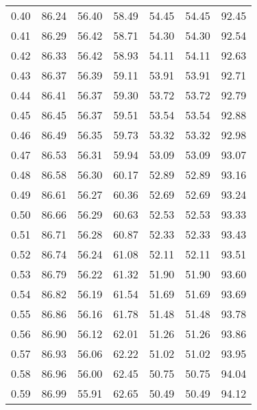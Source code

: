 \begin{tabular}{|c|c|c|c|c|c|c|}
      0.40 &     86.24 &     56.40 &      58.49 &   54.45 &      54.45 &         92.45 \\
      0.41 &     86.29 &     56.42 &      58.71 &   54.30 &      54.30 &         92.54 \\
      0.42 &     86.33 &     56.42 &      58.93 &   54.11 &      54.11 &         92.63 \\
      0.43 &     86.37 &     56.39 &      59.11 &   53.91 &      53.91 &         92.71 \\
      0.44 &     86.41 &     56.37 &      59.30 &   53.72 &      53.72 &         92.79 \\
      0.45 &     86.45 &     56.37 &      59.51 &   53.54 &      53.54 &         92.88 \\
      0.46 &     86.49 &     56.35 &      59.73 &   53.32 &      53.32 &         92.98 \\
      0.47 &     86.53 &     56.31 &      59.94 &   53.09 &      53.09 &         93.07 \\
      0.48 &     86.58 &     56.30 &      60.17 &   52.89 &      52.89 &         93.16 \\
      0.49 &     86.61 &     56.27 &      60.36 &   52.69 &      52.69 &         93.24 \\
      0.50 &     86.66 &     56.29 &      60.63 &   52.53 &      52.53 &         93.33 \\
      0.51 &     86.71 &     56.28 &      60.87 &   52.33 &      52.33 &         93.43 \\
      0.52 &     86.74 &     56.24 &      61.08 &   52.11 &      52.11 &         93.51 \\
      0.53 &     86.79 &     56.22 &      61.32 &   51.90 &      51.90 &         93.60 \\
      0.54 &     86.82 &     56.19 &      61.54 &   51.69 &      51.69 &         93.69 \\
      0.55 &     86.86 &     56.16 &      61.78 &   51.48 &      51.48 &         93.78 \\
      0.56 &     86.90 &     56.12 &      62.01 &   51.26 &      51.26 &         93.86 \\
      0.57 &     86.93 &     56.06 &      62.22 &   51.02 &      51.02 &         93.95 \\
      0.58 &     86.96 &     56.00 &      62.45 &   50.75 &      50.75 &         94.04 \\
      0.59 &     86.99 &     55.91 &      62.65 &   50.49 &      50.49 &         94.12 \\

\end{tabular}
